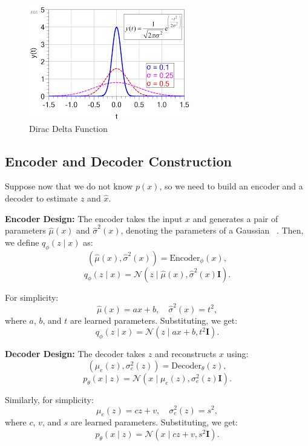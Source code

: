 \begin{figure}[H]
    \centering
    \includegraphics[width=1\linewidth]{sec/dirac.png}
    \caption{Dirac Delta Function}
\end{figure}


\subsection{Encoder and Decoder Construction}
Suppose now that we do not know $p(x)$, so we need to build an encoder and a decoder to estimate $z$ and $\hat{x}$.

\textbf{Encoder Design:}
The encoder takes the input $x$ and generates a pair of parameters $\hat{\mu}(x)$ and $\hat{\sigma}^2(x)$, denoting the parameters of a Gaussian ~\cite{zhang2015kl}. Then, we define $q_\phi(z \mid x)$ as:
\[
(\hat{\mu}(x), \hat{\sigma}^2(x)) = \text{Encoder}_\phi(x),
\]
\[
q_\phi(z \mid x) = \mathcal{N}(z \mid \hat{\mu}(x), \hat{\sigma}^2(x)\mathbf{I}).
\]

For simplicity:
\[
\hat{\mu}(x) = ax + b, \quad \hat{\sigma}^2(x) = t^2,
\]
where $a$, $b$, and $t$ are learned parameters. Substituting, we get:
\[
q_\phi(z \mid x) = \mathcal{N}(z \mid ax + b, t^2 \mathbf{I}).
\]

\textbf{Decoder Design:}
The decoder takes $z$ and reconstructs $x$ using:
\[
(\mu_e(z), \sigma_e^2(z)) = \text{Decoder}_\theta(z),
\]
\[
p_\theta(x \mid z) = \mathcal{N}(x \mid \mu_e(z), \sigma_e^2(z)\mathbf{I}).
\]

Similarly, for simplicity:
\[
\mu_e(z) = cz + v, \quad \sigma_e^2(z) = s^2,
\]
where $c$, $v$, and $s$ are learned parameters. Substituting, we get:
\[
p_\theta(x \mid z) = \mathcal{N}(x \mid cz + v, s^2 \mathbf{I}).
\]
